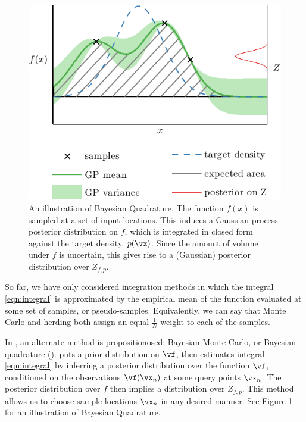 \begin{figure}
\centering
\includegraphics[width=\columnwidth]{figs/herding/bq_intro4}
\caption{An illustration of Bayesian Quadrature.  The function $f(x)$ is sampled at a set of input locations.  This induces a Gaussian process posterior distribution on $f$, which is integrated in closed form against the target density, $p(\vx)$.  Since the amount of volume under $f$ is uncertain, this gives rise to a (Gaussian) posterior distribution over $Z_{f,p}$.}
\label{fig:bq_intro}
\end{figure}

So far, we have only considered integration methods in which the integral \eqref{eqn:integral} is approximated by the empirical mean of the function evaluated at some set of samples, or pseudo-samples.  Equivalently, we can say that Monte Carlo and herding both assign an equal $\frac{1}{N}$ weight to each of the samples.

In \citep{BZMonteCarlo}, an alternate method is propositionosed: Bayesian Monte Carlo, or Bayesian quadrature (\bq).  \bq{} puts a prior distribution on $\vf$, then estimates integral \eqref{eqn:integral} by inferring a posterior distribution over the function $\vf$, conditioned on the observations $\vf(\vx_n)$ at some query points $\vx_n$.  The posterior distribution over $f$ then implies a distribution over $Z_{f,p}$.  This method allows us to choose sample locations $\vx_n$ in any desired manner. See Figure \ref{fig:bq_intro} for an illustration of Bayesian Quadrature.



